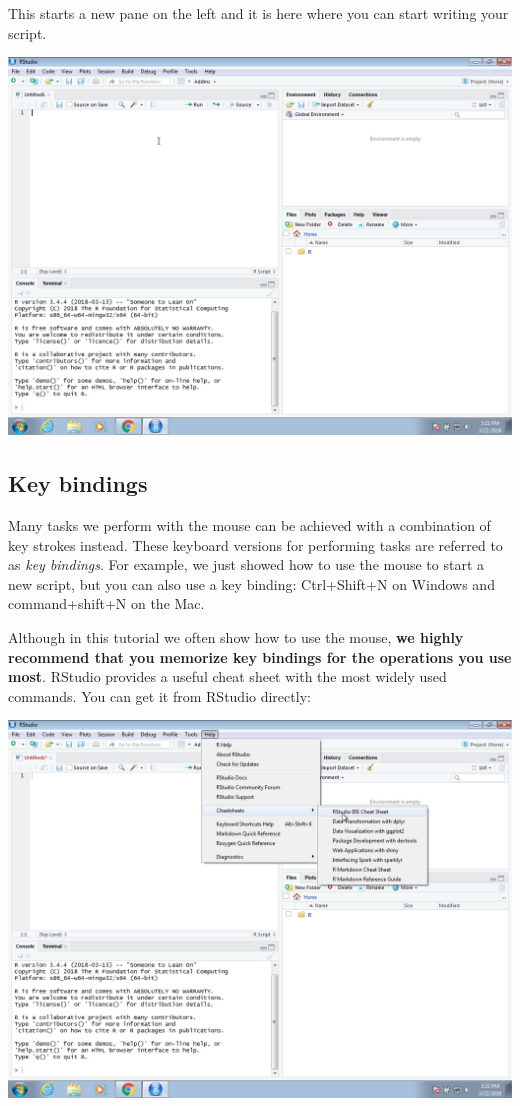 \documentclass[
]{krantz}
\begin{document}
This starts a new pane on the left and it is here where you can start writing your script.

\begin{center}\includegraphics[width=0.7\linewidth]{productivity/img/windows-screenshots/VirtualBox_Windows-7-Enterprise_22_03_2018_16_21_49} \end{center}

\hypertarget{key-bindings}{%
\subsection{Key bindings}\label{key-bindings}}

Many tasks we perform with the mouse can be achieved with a combination of key strokes instead. These keyboard versions for performing tasks are referred to as \emph{key bindings}. For example, we just showed how to use the mouse to start a new script, but you can also use a key binding: Ctrl+Shift+N on Windows and command+shift+N on the Mac.

Although in this tutorial we often show how to use the mouse, \textbf{we highly recommend that you memorize key bindings for the operations you use most}. RStudio provides a useful cheat sheet with the most widely used commands. You can get it from RStudio directly:

\begin{center}\includegraphics[width=0.7\linewidth]{productivity/img/windows-screenshots/VirtualBox_Windows-7-Enterprise_22_03_2018_16_22_20} \end{center}
\end{document}
